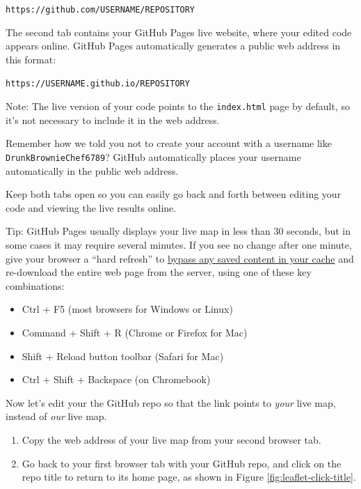 \documentclass[
  english,
]{book}
\providecommand{\tightlist}{%
  \setlength{\itemsep}{0pt}\setlength{\parskip}{0pt}}
\begin{document}
\texttt{https://github.com/USERNAME/REPOSITORY}

The second tab contains your GitHub Pages live website, where your edited code appears online. GitHub Pages automatically generates a public web address in this format:

\texttt{https://USERNAME.github.io/REPOSITORY}

Note: The live version of your code points to the \texttt{index.html} page by default, so it's not necessary to include it in the web address.

Remember how we told you not to create your account with a username like \texttt{DrunkBrownieChef6789}? GitHub automatically places your username automatically in the public web address.

Keep both tabs open so you can easily go back and forth between editing your code and viewing the live results online.

Tip: GitHub Pages usually displays your live map in less than 30 seconds, but in some cases it may require several minutes. If you see no change after one minute, give your browser a ``hard refresh'' to \href{https://en.wikipedia.org/wiki/Wikipedia:Bypass_your_cache}{bypass any saved content in your cache} and re-download the entire web page from the server, using one of these key combinations:

\begin{itemize}
\tightlist
\item
  Ctrl + F5 (most browsers for Windows or Linux)
\item
  Command + Shift + R (Chrome or Firefox for Mac)
\item
  Shift + Reload button toolbar (Safari for Mac)
\item
  Ctrl + Shift + Backspace (on Chromebook)
\end{itemize}

Now let's edit your the GitHub repo so that the link points to \emph{your} live map, instead of \emph{our} live map.

\begin{enumerate}
\def\labelenumi{\arabic{enumi}.}
\setcounter{enumi}{11}
\item
  Copy the web address of your live map from your second browser tab.
\item
  Go back to your first browser tab with your GitHub repo, and click on the repo title to return to its home page, as shown in Figure \ref{fig:leaflet-click-title}.
\end{enumerate}
\end{document}
